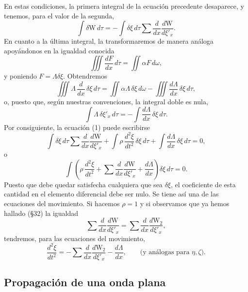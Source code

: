 En estas condiciones, la primera integral de la ecuación precedente
desaparece, y tenemos, para el valor de la segunda,
\[
\int\delta \mathrm{W}\,d\tau=-\int\delta\xi\,d\tau\sum\frac{d}{dx}\frac{d\mathrm{W}}{d\xi'_x}.
\]
En cuanto a la última integral, la transformaremos de manera análoga
apoyándonos en la igualdad conocida
\[
\iiint\frac{dF}{dx}\,d\tau=\iint\alpha F\,d\omega,
\]
y poniendo $F=\Lambda\delta\xi$. Obtendremos
\[
\iiint\Lambda\,\frac{d}{dx}\,\delta\xi\,d\tau
=\iint\alpha\Lambda\,\delta\xi\,d\omega-\iiint\frac{d\Lambda}{dx}\,\delta\xi\,d\tau,
\]
o, puesto que, según nuestras convenciones, la integral doble es nula,
\[
\int\Lambda\,\delta\xi'_x\,d\tau=-\int\frac{d\Lambda}{dx}\,\delta\xi\,d\tau.
\]
Por consiguiente, la ecuación (1) puede escribirse
\[
\int\delta\xi\,d\tau\sum\frac{d}{dx}\frac{d\mathrm{W}}{d\xi'_x}
+\int\rho\,\frac{d^2\xi}{dt^2}\,\delta\xi\,d\tau
+\int\frac{d\Lambda}{dx}\,\delta\xi\,d\tau=0,
\]
o
\[
\int\left(\rho\,\frac{d^2\xi}{dt^2}+\sum\frac{d}{dx}\frac{d\mathrm{W}}{d\xi'_x}
+\frac{d\Lambda}{dx}\right)\delta\xi\,d\tau=0.
\]
Puesto que debe quedar satisfecha cualquiera que sea $\delta\xi$, el
coeficiente de esta cantidad en el elemento diferencial debe ser nulo. Se
tiene así una de las ecuaciones del movimiento. Si hacemos $\rho=1$ y si
observamos que ya hemos hallado (§32) la igualdad
\[
\sum\frac{d}{dx}\frac{d\mathrm{W}}{d\xi'_x}=\sum\frac{d}{dx}\frac{d\mathrm{W}_2}{d\xi'_x},
\]
tendremos, para las ecuaciones del movimiento,
\begin{equation}
\frac{d^2\xi}{dt^2}=-\sum\frac{d}{dx}\frac{d\mathrm{W}_2}{d\xi'_x}-\frac{d\Lambda}{dx},
\qquad\text{(y análogas para $\eta,\zeta$).}
\tag{2}
\end{equation}

\subsection{Propagación de una onda plana}

